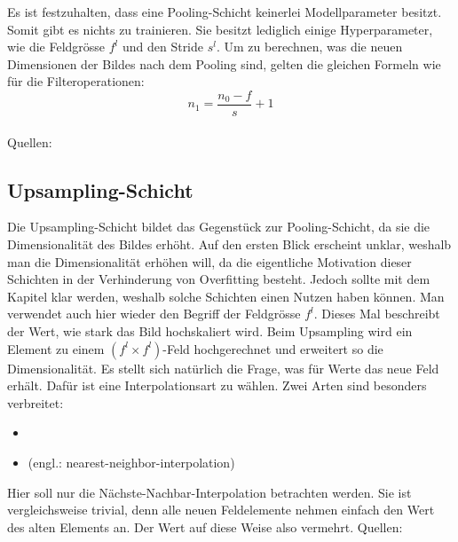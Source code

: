 \para{}
Es ist festzuhalten, dass eine Pooling-Schicht keinerlei Modellparameter
besitzt. Somit gibt es nichts zu trainieren. Sie besitzt lediglich einige
Hyperparameter, wie die Feldgrösse $f^l$ und den Stride $s^l$.
\para{}
Um zu berechnen, was die neuen Dimensionen der Bildes nach dem Pooling sind, gelten die
gleichen Formeln wie für die Filteroperationen:
\\
\begin{equation}
  n_1 = \frac{n_0 - f}{s} + 1
\end{equation}
\\
\para{}
Quellen: \cite{deeplearning.ai:cnn} \cite{Goodfellow-et-al-2016}

\subsection{Upsampling-Schicht}
Die Upsampling-Schicht bildet das Gegenstück zur Pooling-Schicht, da sie die
Dimensionalität des Bildes erhöht. Auf den ersten Blick erscheint unklar,
weshalb man die Dimensionalität erhöhen will, da die eigentliche
Motivation dieser Schichten in der Verhinderung von Overfitting besteht. Jedoch
sollte mit dem Kapitel  klar werden, weshalb solche Schichten
einen Nutzen haben können.
\para{}
Man verwendet auch hier wieder den Begriff der Feldgrösse $f^l$. Dieses Mal
beschreibt der Wert, wie stark das Bild hochskaliert wird. Beim Upsampling
wird ein Element zu einem $(f^l \times f^l)$-Feld hochgerechnet und erweitert so die
Dimensionalität.
\para{}
Es stellt sich natürlich die Frage, was für Werte das neue Feld erhält.
Dafür ist eine Interpolationsart zu wählen.
Zwei Arten sind besonders verbreitet:
\begin{itemize}
\item{}
\item{ (engl.: nearest-neighbor-interpolation)}
\end{itemize}
Hier soll nur die Nächste-Nachbar-Interpolation betrachten werden. Sie ist
vergleichsweise trivial, denn alle neuen Feldelemente nehmen einfach den Wert des alten
Elements an. Der Wert auf diese Weise also vermehrt.
\para{}
Quellen: \cite{deeplearning.ai:cnn} \cite{Goodfellow-et-al-2016}

\pagebreak
